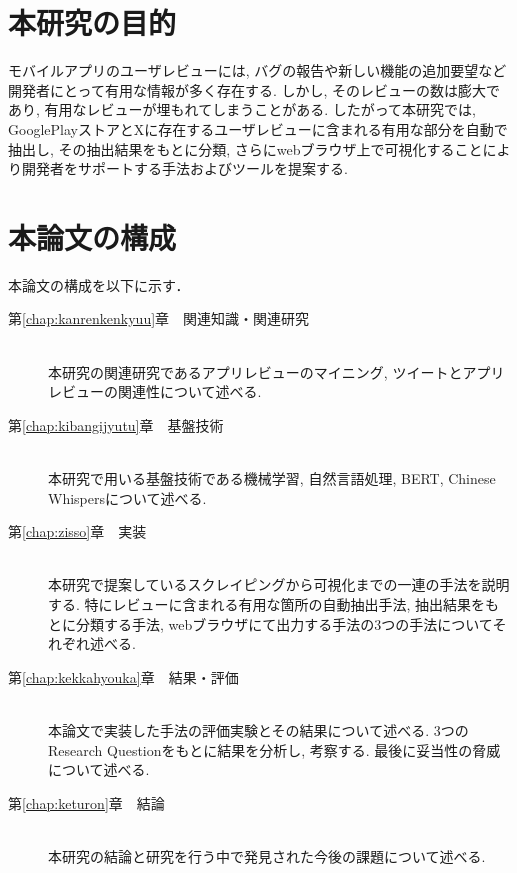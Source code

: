 
\section{本研究の目的}

モバイルアプリのユーザレビューには, バグの報告や新しい機能の追加要望など開発者にとって有用な情報が多く存在する. しかし, そのレビューの数は膨大であり, 有用なレビューが埋もれてしまうことがある. 
したがって本研究では, GooglePlayストアとXに存在するユーザレビューに含まれる有用な部分を自動で抽出し, その抽出結果をもとに分類, さらにwebブラウザ上で可視化することにより開発者をサポートする手法およびツールを提案する. 


\section{本論文の構成}
本論文の構成を以下に示す．
\begin{description}

\item[第\ref{chap:kanrenkenkyuu}章　関連知識・関連研究]\mbox{}\\
本研究の関連研究であるアプリレビューのマイニング, ツイートとアプリレビューの関連性について述べる. \\

\item[第\ref{chap:kibangijyutu}章　基盤技術]\mbox{}\\
本研究で用いる基盤技術である機械学習, 自然言語処理, BERT, Chinese Whispersについて述べる. \\

\item[第\ref{chap:zisso}章　実装]\mbox{}\\
本研究で提案しているスクレイピングから可視化までの一連の手法を説明する. 特にレビューに含まれる有用な箇所の自動抽出手法, 抽出結果をもとに分類する手法, webブラウザにて出力する手法の3つの手法についてそれぞれ述べる. \\

\item[第\ref{chap:kekkahyouka}章　結果・評価]\mbox{}\\
本論文で実装した手法の評価実験とその結果について述べる. 3つのResearch Questionをもとに結果を分析し, 考察する. 最後に妥当性の脅威について述べる. \\

\item[第\ref{chap:keturon}章　結論]\mbox{}\\
本研究の結論と研究を行う中で発見された今後の課題について述べる. \\

\end{description}